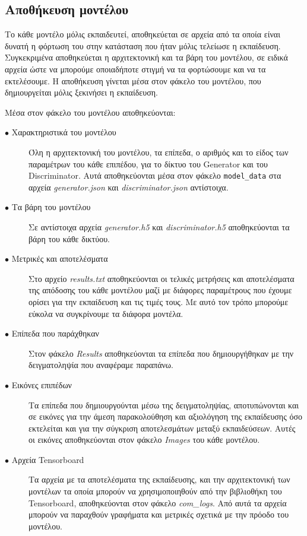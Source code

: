 \subsection{Αποθήκευση μοντέλου}
Το κάθε μοντέλο μόλις εκπαιδευτεί, αποθηκεύεται σε αρχεία από τα οποία είναι δυνατή η φόρτωση του στην κατάσταση που ήταν μόλις τελείωσε η εκπαίδευση. Συγκεκριμένα αποθηκεύεται η αρχιτεκτονική και τα βάρη του μοντέλου, σε ειδικά αρχεία ώστε να μπορούμε οποιαδήποτε στιγμή να τα φορτώσουμε και να τα εκτελέσουμε. Η αποθήκευση γίνεται μέσα στον φάκελο του μοντέλου, που δημιουργείται μόλις ξεκινήσει η εκπαίδευση.
\par
Μέσα στον φάκελο του μοντέλου αποθηκεύονται:
\begin{description}
\item[$\bullet$ Χαρακτηριστικά του μοντέλου] Όλη η αρχιτεκτονική του μοντέλου, τα επίπεδα, ο αριθμός και το είδος των παραμέτρων του κάθε επιπέδου, για το δίκτυο του Generator και του Discriminator. Αυτά αποθηκεύονται μέσα στον φάκελο \texttt{model\_data} στα αρχεία  \textit{generator.json} και \textit{discriminator.json} αντίστοιχα.
\item[$\bullet$ Τα βάρη του μοντέλου] Σε αντίστοιχα αρχεία \textit{generator.h5} και \textit{discriminator.h5} αποθηκεύονται τα βάρη του κάθε δικτύου.
\item[$\bullet$ Μετρικές και αποτελέσματα] Στο αρχείο \textit{results.txt} αποθηκεύονται οι τελικές μετρήσεις και αποτελέσματα της απόδοσης του κάθε μοντέλου μαζί με διάφορες παραμέτρους που έχουμε ορίσει για την εκπαίδευση και τις τιμές τους. Με αυτό τον τρόπο μπορούμε εύκολα να συγκρίνουμε τα διάφορα μοντέλα.
\item[$\bullet$ Επίπεδα που παράχθηκαν] Στον φάκελο \textit{Results} αποθηκεύονται τα επίπεδα που δημιουργήθηκαν με την δειγματοληψία που αναφέραμε παραπάνω.
\item[$\bullet$ Εικόνες επιπέδων] Τα επίπεδα που δημιουργούνται μέσω της δειγματοληψίας, αποτυπώνονται και σε εικόνες για την άμεση παρακολούθηση και αξιολόγηση της εκπαίδευσης όσο εκτελείται και για την σύγκριση αποτελεσμάτων μεταξύ εκπαιδεύσεων. Αυτές οι εικόνες αποθηκεύονται στον φάκελο \textit{Images} του κάθε μοντέλου.
\item[$\bullet$ Αρχεία Tensorboard] Τα αρχεία με τα αποτελέσματα της εκπαίδευσης, και την αρχιτεκτονική των μοντέλων τα οποία μπορούν να χρησιμοποιηθούν από την βιβλιοθήκη του Tensorboard, αποθηκεύονται στον φάκελο \textit{com\_logs}. Από αυτά τα αρχεία μπορούν να παραχθούν γραφήματα και μετρικές σχετικά με την πρόοδο του μοντέλου.
\end{description}


